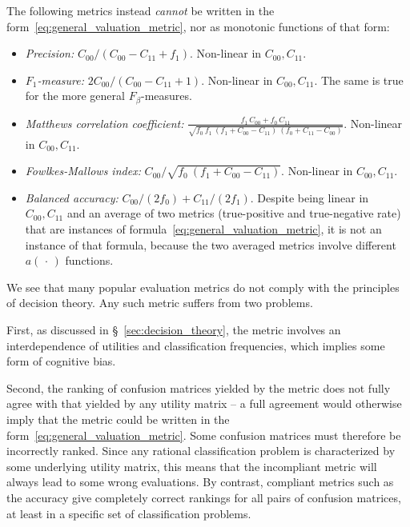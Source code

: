 \documentclass[\ifafour a4paper,12pt,\else a5paper,10pt,\fi%
onecolumn,oneside,article,%
british%
]{memoir}
\theoremstyle{remark}
\theoremstyle{innote}
\newcommand*{\dotv}{\mathord{\,\cdot\,}}%
\renewcommand*{\|}[1][]{\nonscript\:#1\vert\nonscript\:\mathopen{}}
\newcommand*{\sect}{\S}%
\newcommand*{\itemno}{{\fontencoding{U}\fontfamily{pzd}\selectfont\symbol{55}}}
\begin{document}
The following metrics instead \emph{cannot} be written in the form~\eqref{eq:general_valuation_metric}, nor as monotonic functions of that form:
\begin{itemize}
\item[\itemno] \emph{Precision:} $C_{00}/(C_{00}-C_{11}+f_{1})$. Non-linear in $C_{00}, C_{11}$.

\item[\itemno] \emph{$F_{1}$-measure:} $2 C_{00}/(C_{00} - C_{11} + 1)$. Non-linear in $C_{00}, C_{11}$. The same is true for the more general $F_{\beta}$-measures.

\item[\itemno] \emph{Matthews correlation coefficient:} $\frac{
    f_{1}\,C_{00} + f_{0}\,C_{11}}{\sqrt{
      f_{0}\ f_{1}\ (f_{1} + C_{00} - C_{11})\ (f_{0} + C_{11} - C_{00})
    }}$. Non-linear in $C_{00}, C_{11}$.

\item[\itemno] \emph{Fowlkes-Mallows index:} $C_{00}/\sqrt{
      f_{0}\ (f_{1} + C_{00} - C_{11})}$. Non-linear in $C_{00}, C_{11}$.

  \item[\itemno] \emph{Balanced accuracy:} $C_{00}/(2 f_{0}) + C_{11}/(2 f_{1})$. Despite being linear in $C_{00}, C_{11}$ and an average of two metrics (true-positive and true-negative rate) that are instances of formula~\eqref{eq:general_valuation_metric}, it is not an instance of that formula, because the two averaged metrics involve different $a(\dotv)$ functions.
\end{itemize}

We see that many popular evaluation metrics do not comply with the principles of decision theory. Any such metric suffers from two problems.

First, as discussed in \sect~\ref{sec:decision_theory}, the metric involves an interdependence of utilities and classification frequencies, which implies some form of cognitive bias\autocites[discuss such biases regarding the $F_{1}$-measure]{handetal2018}.

Second, the ranking of confusion matrices yielded by the metric does not fully agree with that yielded by any utility matrix -- a full agreement would otherwise imply that the metric could be written in the form~\eqref{eq:general_valuation_metric}. Some confusion matrices must therefore be incorrectly ranked. Since any rational classification problem is characterized by some underlying utility matrix, this means that the incompliant metric will always lead to some wrong evaluations. By contrast, compliant metrics such as the accuracy give completely correct rankings for all pairs of confusion matrices, at least in a specific set of classification problems.
\end{document}
